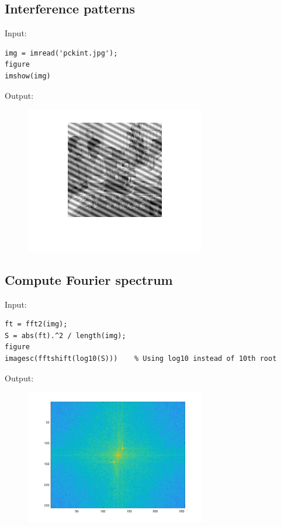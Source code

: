 \documentclass[12pt, a4paper]{article}
\begin{document}
\subsection{Interference patterns}
Input:
\begin{verbatim}
img = imread('pckint.jpg');
figure
imshow(img)
\end{verbatim}
Output:
\begin{figure}[H]
    \centering
    \includegraphics[width=0.7\textwidth]{fig21.png}
\end{figure}

\subsection{Compute Fourier spectrum}
Input:
\begin{verbatim}
ft = fft2(img);
S = abs(ft).^2 / length(img);
figure
imagesc(fftshift(log10(S)))    % Using log10 instead of 10th root
\end{verbatim}
\newpage
Output:
\\[-12mm]
\begin{figure}[H]
    \centering
    \includegraphics[width=0.7\textwidth]{fig22.png}
\end{figure}
~\\[-15mm]
\end{document}

